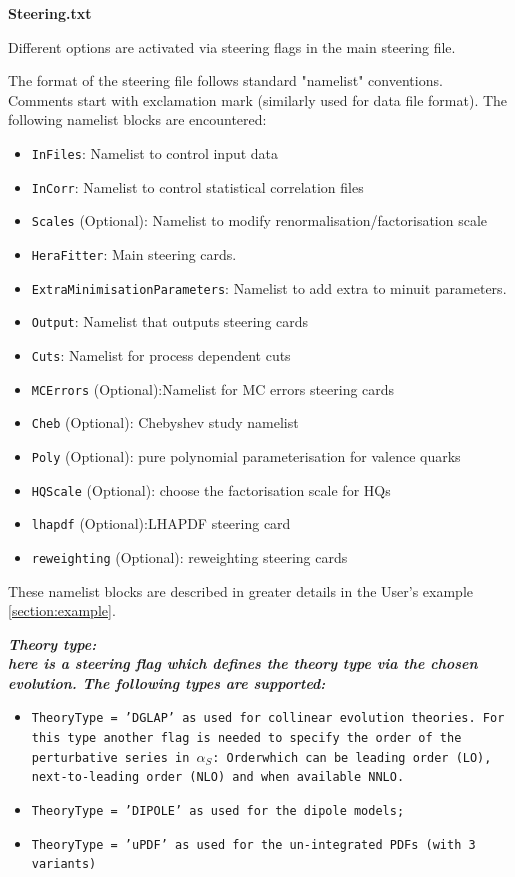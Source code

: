 \begin{description}
\item \bf{Steering.txt}\rm 

Different options are activated via steering flags in the main steering file.
 
The format of the steering file follows standard "namelist" conventions.
Comments start with exclamation mark (similarly used for data file format).
The following namelist blocks are encountered:
\begin{itemize}
\item  {\tt InFiles}: Namelist to control input data
\item  {\tt InCorr}: Namelist to control statistical correlation files
\item  {\tt Scales} (Optional): Namelist to modify renormalisation/factorisation scale
\item  {\tt HeraFitter}: Main steering cards. 
\item  {\tt ExtraMinimisationParameters}:  Namelist to add extra to minuit parameters.
\item  {\tt Output}: Namelist that outputs steering cards 
\item  {\tt Cuts}: Namelist for process dependent cuts
\item  {\tt MCErrors} (Optional):Namelist for MC errors steering cards
\item  {\tt Cheb} (Optional): Chebyshev study namelist
\item  {\tt Poly} (Optional): pure polynomial parameterisation for valence quarks
\item  {\tt HQScale} (Optional): choose the factorisation scale for HQs
\item  {\tt lhapdf} (Optional):LHAPDF steering card
\item  {\tt reweighting} (Optional): reweighting steering cards
\end{itemize}

These namelist blocks are described in greater details in the User's example \ref{section:example}. 


\begin{description}
\item \it\bf Theory type: \rm\\
 
here is a steering flag which defines the theory type via the chosen evolution.
The following types are supported:
\begin{itemize}
\item \tt{TheoryType = 'DGLAP' }\rm as used for collinear evolution theories. For this type another 
 flag is needed to specify the order of the perturbative series in $\alpha_S$:
\tt{Order}\rm which can be leading order (LO), next-to-leading order (NLO) and when available NNLO.
\item \tt{TheoryType = 'DIPOLE' }\rm as used for the dipole models;
\item \tt{TheoryType = 'uPDF' }\rm as used for the un-integrated PDFs (with 3 variants)
\end{itemize}


\end{description}
\end{description}
